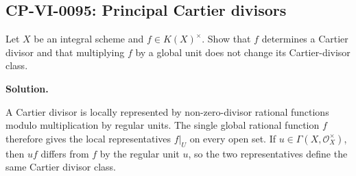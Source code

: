 
\subsection*{CP-VI-0095: Principal Cartier divisors}

Let $X$ be an integral scheme and $f\in K(X)^\times$. Show that $f$ determines a Cartier divisor and that multiplying $f$ by a global unit does not change its Cartier-divisor class.

\medskip
\noindent\textbf{Solution.}

A Cartier divisor is locally represented by non-zero-divisor rational functions modulo multiplication by regular units. The single global rational function $f$ therefore gives the local representatives $f|_U$ on every open set. If $u\in\Gamma(X,\mathcal O_X^\times)$, then $uf$ differs from $f$ by the regular unit $u$, so the two representatives define the same Cartier divisor class.
